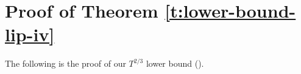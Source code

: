 \documentclass[final,12pt]{colt2025}
\begin{document}
\section{Proof of Theorem \ref{t:lower-bound-lip-iv}}
\label{s:kl-bounds}











The following is the proof of our $T^{2/3}$ lower bound (). 
\end{document}
